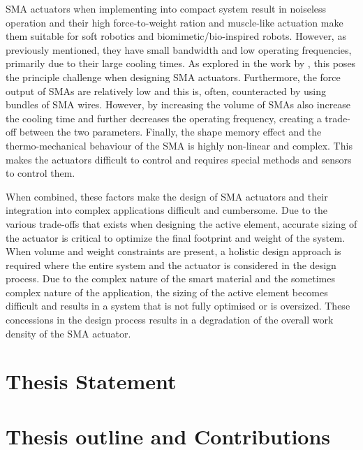 SMA actuators when implementing into compact system result in noiseless operation and their high force-to-weight ration and muscle-like actuation make them suitable for soft robotics and biomimetic/bio-inspired robots. However, as previously mentioned, they have small bandwidth and low operating frequencies, primarily due to their large cooling times. As explored in the work by \cite{sootherChallengesPracticalApplications2020}, this poses the principle challenge when designing SMA actuators. Furthermore, the force output of SMAs are relatively low and this is, often, counteracted by using bundles of SMA wires. However, by increasing the volume of SMAs also increase the cooling time and further decreases the operating frequency, creating a trade-off between the two parameters. Finally, the shape memory effect and the thermo-mechanical behaviour of the SMA is highly non-linear and complex. This makes the actuators difficult to control and requires special methods and sensors to control them.

When combined, these factors make the design of SMA actuators and their integration into complex applications difficult and cumbersome. Due to the various trade-offs that exists when designing the active element, accurate sizing of the actuator is critical to optimize the final footprint and weight of the system. When volume and weight constraints are present, a holistic design approach is required where the entire system and the actuator is considered in the design process. Due to the complex nature of the smart material and the sometimes complex nature of the application, the sizing of the active element becomes difficult and results in a system that is not fully optimised or is oversized. These concessions in the design process results in a degradation of the overall work density of the SMA actuator.

\section*{Thesis Statement}



\section*{Thesis outline and Contributions}
